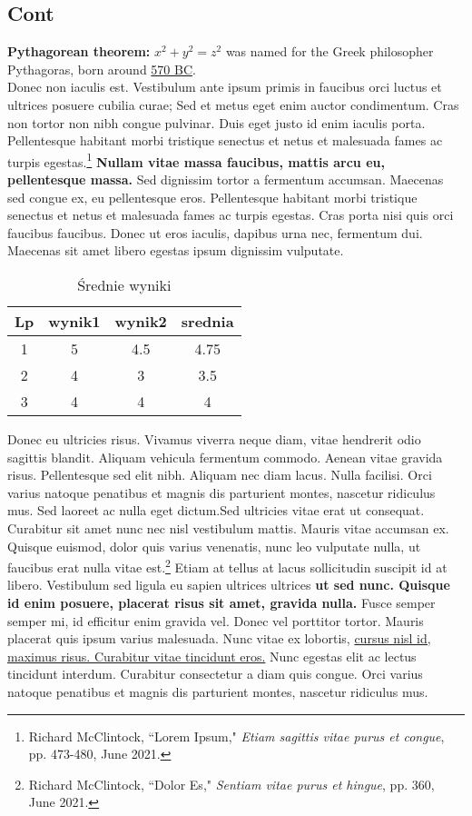 \documentclass[12pt,a4paper]{article}
\begin{document}
\subsection{Cont}
	\textbf{Pythagorean theorem:} \(x^2 + y^2 = z^2\) was named for the Greek philosopher Pythagoras, born around \underline{570 BC}.
	\\Donec non iaculis est. Vestibulum ante ipsum primis in faucibus orci luctus et ultrices posuere cubilia curae; Sed et metus eget enim auctor condimentum. Cras non tortor non nibh congue pulvinar. Duis eget justo id enim iaculis porta. Pellentesque habitant morbi tristique senectus et netus et malesuada fames ac turpis egestas.\footnote{Richard McClintock, ``Lorem Ipsum," \emph{Etiam sagittis vitae purus et congue}, pp. 473-480, June 2021.} \textbf{Nullam vitae massa faucibus, mattis arcu eu, pellentesque massa.} Sed dignissim tortor a fermentum accumsan. Maecenas sed congue ex, eu pellentesque eros. Pellentesque habitant morbi tristique senectus et netus et malesuada fames ac turpis egestas. Cras porta nisi quis orci faucibus faucibus. Donec ut eros iaculis, dapibus urna nec, fermentum dui. Maecenas sit amet libero egestas ipsum dignissim vulputate. 
	\begin{table}[H]
		\centering
		\begin{tabular}{||c c c c||} 
			\hline
			Lp & wynik1 & wynik2 & srednia \\ [0.5ex] 
			\hline\hline
			1 & 5 & 4.5 & 4.75 \\ 
			\hline
			2 & 4 & 3 & 3.5 \\
			\hline
			3 & 4 & 4 & 4 \\ [1ex] 
			\hline
		\end{tabular}
	\caption{Średnie wyniki}
	\label{table: SrednieWyniki}
	\end{table}
	Donec eu ultricies risus. Vivamus viverra neque diam, vitae hendrerit odio sagittis blandit. Aliquam vehicula fermentum commodo. Aenean vitae gravida risus. Pellentesque sed elit nibh. Aliquam nec diam lacus. Nulla facilisi. Orci varius natoque penatibus et magnis dis parturient montes,\cite{A2} nascetur ridiculus mus. Sed laoreet ac nulla eget dictum.Sed ultricies vitae erat ut consequat. Curabitur sit amet nunc nec nisl vestibulum mattis. Mauris vitae accumsan ex. Quisque euismod, dolor quis varius venenatis, nunc leo vulputate nulla, ut faucibus erat nulla vitae est.\footnote{Richard McClintock, ``Dolor Es," \emph{Sentiam vitae purus et hingue}, pp. 360, June 2021.} Etiam at tellus at lacus sollicitudin suscipit id at libero. Vestibulum sed ligula eu sapien ultrices ultrices \textbf{ut sed nunc. Quisque id enim posuere, placerat risus sit amet, gravida nulla.} Fusce semper semper mi, id efficitur enim gravida vel. Donec vel porttitor tortor. Mauris placerat quis ipsum varius malesuada. Nunc vitae ex lobortis, \underline{cursus nisl id, maximus risus. Curabitur vitae tincidunt eros.} Nunc egestas elit ac lectus tincidunt interdum. Curabitur consectetur a diam quis congue. Orci varius natoque penatibus et magnis dis parturient montes, nascetur ridiculus mus. 
\end{document}
